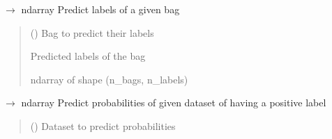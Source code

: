 \documentclass[letterpaper,10pt,english]{sphinxmanual}
\begin{document}
\begin{fulllineitems}
\begin{fulllineitems}
\label{\detokenize{classifier/_autosummary/miml.classifier.miml_classifier.MIMLClassifier:miml.classifier.miml_classifier.MIMLClassifier.predict_bag}}
\pysigstartsignatures
\pysiglinewithargsret
{}
{}
{{ $\rightarrow$ ndarray}}
\pysigstopsignatures
\sphinxAtStartPar
Predict labels of a given bag
\begin{quote}\begin{description}
\sphinxAtStartPar
{} ({\hyperref[\detokenize{data/_autosummary/miml.data.bag.Bag:miml.data.bag.Bag}]{}}) \textendash{} Bag to predict their labels

\sphinxAtStartPar
{} \textendash{} Predicted labels of the bag

\sphinxAtStartPar
ndarray of shape (n\_bags, n\_labels)

\end{description}\end{quote}

\end{fulllineitems}


\begin{fulllineitems}
\label{\detokenize{classifier/_autosummary/miml.classifier.miml_classifier.MIMLClassifier:miml.classifier.miml_classifier.MIMLClassifier.predict_proba}}
\pysigstartsignatures
\pysiglinewithargsret
{}
{}
{{ $\rightarrow$ ndarray}}
\pysigstopsignatures
\sphinxAtStartPar
Predict probabilities of given dataset of having a positive label
\begin{quote}\begin{description}
\sphinxAtStartPar
{} ({\hyperref[\detokenize{data/_autosummary/miml.data.miml_dataset.MIMLDataset:miml.data.miml_dataset.MIMLDataset}]{}}) \textendash{} Dataset to predict probabilities


\end{description}
\end{quote}
\end{fulllineitems}
\end{fulllineitems}
\end{document}

